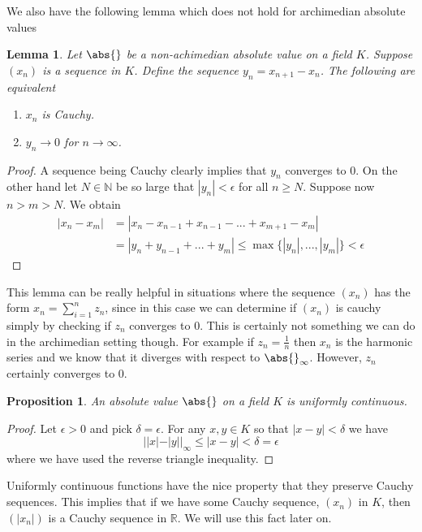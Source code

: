 \documentclass{article}
\newtheorem{proposition}{Proposition}[section]
\newtheorem{lemma}{Lemma}[section]
\newcommand{\mbb}[1]{\mathbb{#1}}
\begin{document}
We also have the following lemma which does not hold for archimedian absolute values

\begin{lemma} \label{lem:SufficientConditionForConvergence}
    Let $\abs{}$ be a non-achimedian absolute value on a field $K$. Suppose $(x_n)$ is a sequence in $K$. Define the sequence $y_n = x_{n+1} - x_{n}$. The following are equivalent
    \begin{enumerate}
        \item $x_n$ is Cauchy.
        \item $y_n \to 0$ for $n \to \infty$.
    \end{enumerate}
\end{lemma}
\begin{proof}
    A sequence being Cauchy clearly implies that $y_n$ converges to 0. On the other hand let $N \in \mbb N$ be so large that $|y_n| < \epsilon$ for all $n \geq N$. Suppose now $n > m > N$. We obtain
    \begin{align*}
        |x_n - x_m| &= |x_n - x_{n-1} + x_{n-1} - ... + x_{m+1} - x_{m}| \\ 
        &= |y_n + y_{n-1} + ... + y_{m}| \leq \max \{|y_n|, ..., |y_m|  \} < \epsilon
    \end{align*}
\end{proof}
This lemma can be really helpful in situations where the sequence $(x_n)$ has the form $x_n = \sum_{i = 1}^n z_n$, since in this case we can determine if $(x_n)$ is cauchy simply by checking if $z_n$ converges to 0. This is certainly not something we can do in the archimedian setting though. For example if $z_n = \frac{1}{n}$ then $x_n$ is the harmonic series and we know that it diverges with respect to $\abs{}_\infty$. However, $z_n$ certainly converges to 0. 

\begin{proposition}
    An absolute value $\abs{}$ on a field $K$ is uniformly continuous.  
\end{proposition}
\begin{proof}
    Let $\epsilon > 0$ and pick $\delta = \epsilon$. For any $x,y \in K$ so that $|x - y| < \delta$ we have 
    $$||x| - |y||_\infty \leq |x - y| < \delta = \epsilon$$
    where we have used the reverse triangle inequality. 
\end{proof}

Uniformly continuous functions have the nice property that they preserve Cauchy sequences. This implies that if we have some Cauchy sequence, $(x_n)$ in $K$, then $(|x_n|)$ is a Cauchy sequence in $\mbb R$. We will use this fact later on.
\end{document}
